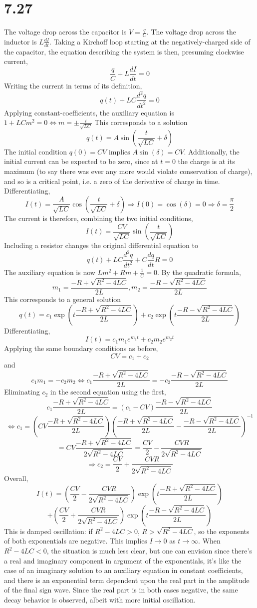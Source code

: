 \documentclass{article}
\begin{document}
\section*{7.27}
The voltage drop across the capacitor is $V=\frac{q}{C}$. The voltage drop across the inductor is $L\frac{dI}{dt}$. Taking a Kirchoff loop starting at the negatively-charged side of the capacitor, the equation describing the system is then, presuming clockwise current,
\[\frac{q}{C}+L\frac{dI}{dt}=0\]
Writing the current in terms of its definition,
\[q(t)+LC\frac{d^2q}{dt^2}=0\]
Applying constant-coefficients, the auxiliary equation is $1+LCm^2=0\Leftrightarrow m=\pm\frac{i}{\sqrt{LC}}$
This corresponds to a solution
\[q(t)=A\sin\left(\frac{t}{\sqrt{LC}}+\delta\right)\]
The initial condition $q(0)=CV$ implies $A\sin(\delta)=CV$. Additionally, the initial current can be expected to be zero, since at $t=0$ the charge is at its maximum (to say there was ever any more would violate conservation of charge), and so is a critical point, i.e. a zero of the derivative of charge in time.
Differentiating,
\[I(t)=\frac{A}{\sqrt{LC}}\cos\left(\frac{t}{\sqrt{LC}}+\delta\right)\Rightarrow I(0)=\cos(\delta)=0\Rightarrow \delta=\frac{\pi}{2}\]
The current is therefore, combining the two initial conditions,
\[I(t)=\frac{CV}{\sqrt{LC}}\sin\left(\frac{t}{\sqrt{LC}}\right)\]
Including a resistor changes the original differential equation to
\[q(t)+LC\frac{d^2q}{dt^2}+C\frac{dq}{dt}R=0\]
The auxiliary equation is now $Lm^2+Rm+\frac{1}{C}=0$. By the quadratic formula,
\[m_1=\frac{-R+\sqrt{R^2-4LC}}{2L}, m_2=\frac{-R-\sqrt{R^2-4LC}}{2L}\]
This corresponds to a general solution
\[q(t)=c_1\exp\left( t\frac{-R+\sqrt{R^2-4LC}}{2L} \right)+c_2\exp\left( t\frac{-R-\sqrt{R^2-4LC}}{2L} \right)\]
Differentiating,
\[I(t)=c_1m_1e^{m_1t}+c_2m_2e^{m_2t}\]
Applying the same boundary conditions as before,
\[CV=c_1+c_2\]
and
\[c_1m_1=-c_2m_2\Leftrightarrow c_1\frac{-R+\sqrt{R^2-4LC}}{2L}=-c_2\frac{-R-\sqrt{R^2-4LC}}{2L}\]
Eliminating $c_2$ in the second equation using the first,
\[c_1\frac{-R+\sqrt{R^2-4LC}}{2L}=(c_1-CV)\frac{-R-\sqrt{R^2-4LC}}{2L}\]
\[\Leftrightarrow c_1=\left( CV\frac{-R+\sqrt{R^2-4LC}}{2L} \right)\left( \frac{-R+\sqrt{R^2-4LC}}{2L}-\frac{-R-\sqrt{R^2-4LC}}{2L} \right)^{-1}\]
\[=CV\frac{-R+\sqrt{R^2-4LC}}{2\sqrt{R^2-4LC}}=\frac{CV}{2}-\frac{CVR}{2\sqrt{R^2-4LC}}\]
\[\Rightarrow c_2=\frac{CV}{2}+\frac{CVR}{2\sqrt{R^2-4LC}}\]
Overall,
\[I(t)=\left( \frac{CV}{2}-\frac{CVR}{2\sqrt{R^2-4LC}} \right)\exp\left( t\frac{-R+\sqrt{R^2-4LC}}{2L} \right)\]\[+\left( \frac{CV}{2}+\frac{CVR}{2\sqrt{R^2-4LC}} \right)\exp\left( t\frac{-R-\sqrt{R^2-4LC}}{2L} \right)\]
This is damped oscillation: if $R^2-4LC > 0$, $R > \sqrt{R^2-4LC}$, so the exponents of both exponentials are negative. This implies $I\to 0$ as $t\to \infty$. When $R^2-4LC < 0$, the situation is much less clear, but one can envision since there's a real and imaginary component in argument of the exponentials, it's like the case of an imaginary solution to an auxiliary equation in constant coefficients, and there is an exponential term dependent upon the real part in the amplitude of the final sign wave. Since the real part is in both cases negative, the same decay behavior is observed, albeit with more initial oscillation.
\end{document}
